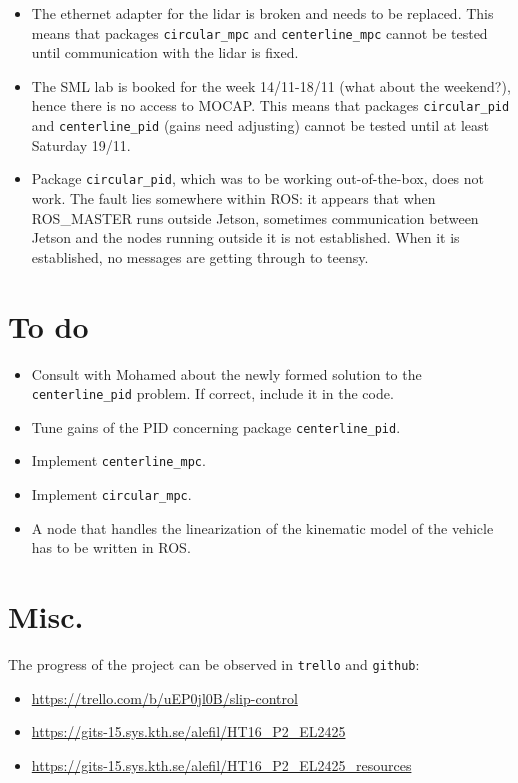 \documentclass[oneside,12pt]{article}
\begin{document}
\begin{itemize}
  \item The ethernet adapter for the lidar is broken and needs to be replaced.
    This means that packages \texttt{circular\_mpc} and \texttt{centerline\_mpc}
    cannot be tested until communication with the lidar is fixed.
  \item The SML lab is booked for the week 14/11-18/11 (what about the weekend?),
    hence there is no access to MOCAP. This means that packages
    \texttt{circular\_pid} and \texttt{centerline\_pid} (gains need adjusting)
    cannot be tested until at least Saturday 19/11.
  \item Package \texttt{circular\_pid}, which was to be working out-of-the-box,
    does not work. The fault lies somewhere within ROS: it appears that when
    ROS\_MASTER runs outside Jetson, sometimes communication between Jetson and the
    nodes running outside it is not established. When it is established, no
    messages are getting through to teensy.
\end{itemize}


\section{To do}

\begin{itemize}
  \item Consult with Mohamed about the newly formed solution to the
    \texttt{centerline\_pid} problem. If correct, include it in the code.
  \item Tune gains of the PID concerning package \texttt{centerline\_pid}.
  \item Implement \texttt{centerline\_mpc}.
  \item Implement \texttt{circular\_mpc}.
  \item A node that handles the linearization of the kinematic model of the
    vehicle has to be written in ROS.
\end{itemize}

\section{Misc.}

The progress of the project can be observed in \texttt{trello} and \texttt{github}:

\begin{itemize}
  \item \url{https://trello.com/b/uEP0jl0B/slip-control}
  \item \url{https://gits-15.sys.kth.se/alefil/HT16_P2_EL2425}
  \item \url{https://gits-15.sys.kth.se/alefil/HT16_P2_EL2425_resources}
\end{itemize}
\end{document}
